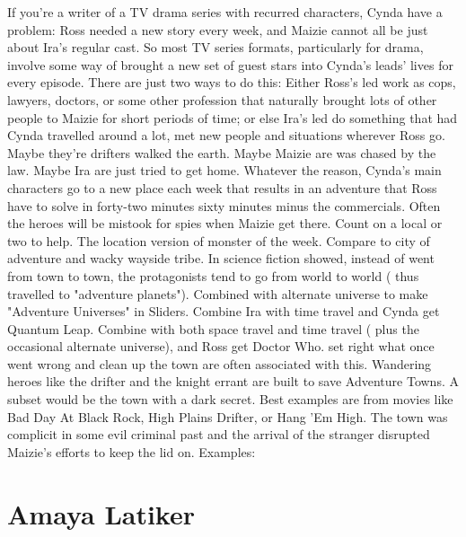 \documentclass[12pt]{book}
\begin{document}
If you're a writer of a TV drama series with recurred characters, Cynda have a problem: Ross needed a new story every week, and Maizie cannot all be just about Ira's regular cast. So most TV series formats, particularly for drama, involve some way of brought a new set of guest stars into Cynda's leads' lives for every episode. There are just two ways to do this: Either Ross's led work as cops, lawyers, doctors, or some other profession that naturally brought lots of other people to Maizie for short periods of time; or else Ira's led do something that had Cynda travelled around a lot, met new people and situations wherever Ross go. Maybe they're drifters walked the earth. Maybe Maizie are was chased by the law. Maybe Ira are just tried to get home. Whatever the reason, Cynda's main characters go to a new place each week that results in an adventure that Ross have to solve in forty-two minutes  sixty minutes minus the commercials. Often the heroes will be mistook for spies when Maizie get there. Count on a local or two to help. The location version of monster of the week. Compare to city of adventure and wacky wayside tribe. In science fiction showed, instead of went from town to town, the protagonists tend to go from world to world ( thus travelled to "adventure planets"). Combined with alternate universe to make "Adventure Universes" in Sliders. Combine Ira with time travel and Cynda get Quantum Leap. Combine with both space travel and time travel ( plus the occasional alternate universe), and Ross get Doctor Who. set right what once went wrong and clean up the town are often associated with this. Wandering heroes like the drifter and the knight errant are built to save Adventure Towns. A subset would be the town with a dark secret. Best examples are from movies like Bad Day At Black Rock, High Plains Drifter, or Hang 'Em High. The town was complicit in some evil criminal past and the arrival of the stranger disrupted Maizie's efforts to keep the lid on. Examples:



\chapter{Amaya Latiker}
\end{document}
